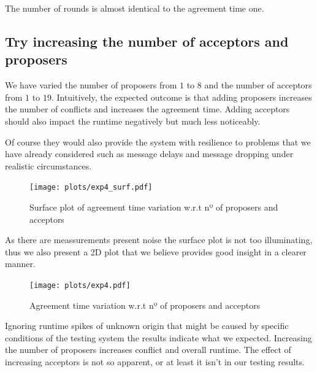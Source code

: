 \documentclass[a4paper, 10pt]{article}
\begin{document}
The number of rounds is almost identical to the agreement time one.


\clearpage
\subsection{Try increasing the number of acceptors and proposers}

We have varied the number of proposers from $1$ to $8$ and the number of acceptors
from $1$ to $19$. Intuitively, the expected outcome is that adding proposers increases the number of conflicts and increases the agreement time. Adding acceptors should also impact the runtime negatively but much less noticeably. 

Of course they would also provide the system with resilience to problems that we have already considered such as message delays and message dropping under realistic circumstances. 

\begin{figure}[H]
  \centering
  \texttt{[image: plots/exp4\_surf.pdf]}
    \caption{Surface plot of agreement time variation w.r.t nº of proposers and acceptors}
\end{figure} 

As there are meassurements present noise the surface plot is not too illuminating, thus we also present a 2D plot that we believe provides good insight in a clearer manner.

\clearpage
\begin{figure}[H]
  \centering
  \texttt{[image: plots/exp4.pdf]}
    \caption{Agreement time variation w.r.t nº of proposers and acceptors}
\end{figure} 


Ignoring runtime spikes of unknown origin that might be caused by specific conditions of the testing system the results indicate what we expected. Increasing the number of proposers increases conflict and overall runtime. The effect of increasing acceptors is not so apparent, or at least it isn't in our testing results.


\clearpage
\end{document}
